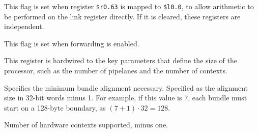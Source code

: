 \implementation{}

\reset{*}
This flag is set when register \texttt{\$r0.63} is mapped to \texttt{\$l0.0}, to
allow arithmetic to be performed on the link register directly. If it is
cleared, these registers are independent.

\implementation{}

\reset{*}
This flag is set when forwarding is enabled.

\implementation{}


This register is hardwired to the key parameters that define the size of the
processor, such as the number of pipelanes and the number of contexts.

\reset{****}
Specifies the minimum bundle alignment necessary. Specified as the alignment
size in 32-bit words minus 1. For example, if this value is 7, each bundle must
start on a 128-byte boundary, as $(7 + 1) \cdot 32 = 128$.

\implementation{}

\reset{****}
Number of hardware contexts supported, minus one.

\implementation{}

